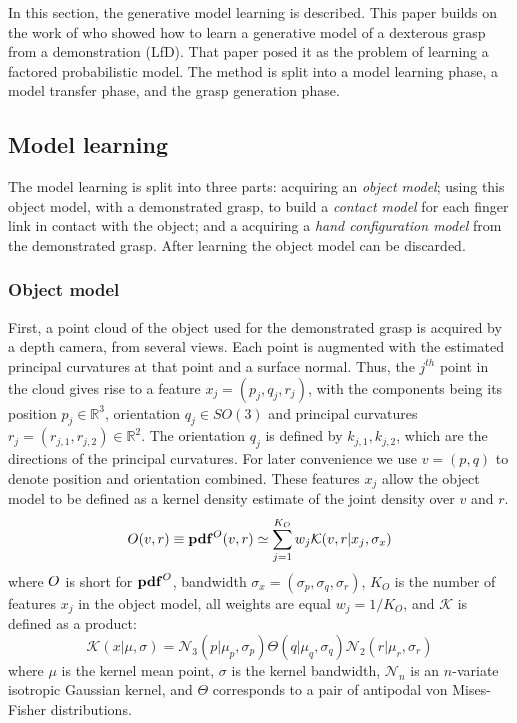 In this section, the generative model learning is described. This paper builds on the work of \citet{kopicki2015ijrr} who showed how to learn a generative model of a dexterous grasp from a demonstration (LfD). That paper posed it as the problem of learning a factored probabilistic model. The method is split into a model learning phase, a model transfer phase, and the grasp generation phase. 

\subsection{Model learning}
The model learning is split into three parts: acquiring an {\em object model}; using this object model, with a demonstrated grasp, to build a {\em contact model} for each finger link in contact with the object; and a acquiring a {\em hand configuration model} from the demonstrated grasp. After learning the object model can be discarded.

\subsubsection{Object model}
First, a point cloud of the object used for the demonstrated grasp is acquired by a depth camera, from several views. Each point is augmented with the estimated principal curvatures at that point and a surface normal. Thus, the $j^{th}$ point  in the cloud gives rise to a feature $x_j=(p_j, q_j, r_j)$, with the components being its position $p_j \in \mathbb R^3$, orientation $q_j \in SO(3)$ and principal curvatures $r_j=(r_{j,1},r_{j,2}) \in \mathbb R^2$. The orientation $q_j$ is defined by $k_{j,1},k_{j,2}$, which are the directions of the principal curvatures.  For later convenience we use $v=(p,q)$ to denote position and orientation combined. These features $x_j$ allow the object model to be defined as a kernel density estimate of the joint density over $v$ and $r$.
\begin{equation}
\om(v, r) \equiv \pdf^\om(v, r) \simeq \sum_{j=1}^{K_O} w_j \mathcal{K}(v, r|{x_j}, \sigma_{x})
\label{eq:om}
\end{equation}
where $O$ is short for $\mathbf{pdf}^O$, bandwidth $\sigma_{x} = (\sigma_{p}, \sigma _{q}, \sigma_{r})$, $K_O$ is the number of features $x_j$ in the object model, all weights are equal $w_j = 1/{K_O}$, and $\mathcal{K}$ is defined as a product:
\begin{equation}\label{eq:kernel_in_se3}
\mathcal{K}(x | \mu, \sigma) = \mathcal{N}_3(p| \mu_p, \sigma_p) \Theta(q| \mu_q, \sigma_q) \mathcal{N}_2(r| \mu_r, \sigma_r)
\end{equation}
where $\mu$ is the kernel mean point, $\sigma$ is the kernel bandwidth, $\mathcal{N}_n$ is an $n$-variate isotropic Gaussian kernel, and ${\Theta}$ corresponds to a pair of antipodal von Mises-Fisher distributions.

